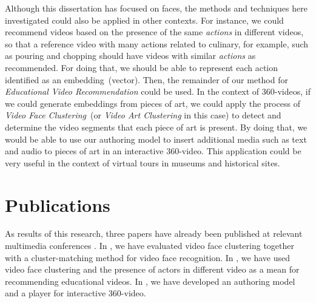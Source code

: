 Although this dissertation has focused on faces, the methods and techniques here investigated could also be applied in other contexts. For instance, we could recommend videos based on the presence of the same \emph{actions} in different videos, so that a reference video with many actions related to culinary, for example, such as pouring and chopping should have videos with similar \emph{actions} as recommended. For doing that, we should be able to represent each action identified as an embedding~(vector). Then, the remainder of our method for \emph{Educational Video Recommendation} could be used. In the context of 360-videos, if we could generate embeddings from pieces of art, we could apply the process of \emph{Video Face Clustering}~(or \emph{Video Art Clustering} in this case) to detect and determine the video segments that each piece of art is present. By doing that, we would be able to use our authoring model to insert additional media such as text and audio to pieces of art in an interactive 360-video. This application could be very useful in the context of virtual tours in museums and historical sites.


\section{Publications}

 As results of this research, three papers have already been published at relevant multimedia conferences \cite{mendes2020cluster,mendes2020ISM, mendes2020authoring}. In \cite{mendes2020cluster}, we have evaluated video face clustering together with a cluster-matching method for video face recognition. In \cite{mendes2020ISM}, we have used video face clustering and the presence of actors in different video as a mean for recommending educational videos. In \cite{mendes2020authoring}, we have developed an authoring model and a player for interactive 360-video. 